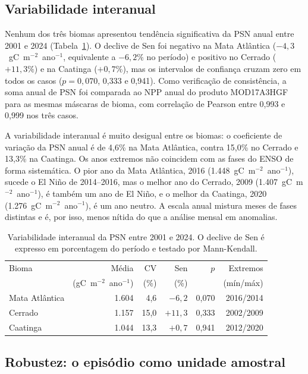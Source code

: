 \documentclass[a4paper,fleqn]{cas-sc}
\begin{document}
\subsection{Variabilidade interanual}

Nenhum dos três biomas apresentou tendência significativa da PSN anual entre 2001 e 2024 (Tabela~\ref{tab:interanual}). O declive de Sen foi negativo na Mata Atlântica ($-4{,}3$~gC~m$^{-2}$~ano$^{-1}$, equivalente a $-6{,}2\%$ no período) e positivo no Cerrado ($+11{,}3\%$) e na Caatinga ($+0{,}7\%$), mas os intervalos de confiança cruzam zero em todos os casos ($p = 0{,}070$, 0,333 e 0,941). Como verificação de consistência, a soma anual de PSN foi comparada ao NPP anual do produto MOD17A3HGF para as mesmas máscaras de bioma, com correlação de Pearson entre 0,993 e 0,999 nos três casos.

A variabilidade interanual é muito desigual entre os biomas: o coeficiente de variação da PSN anual é de 4,6\% na Mata Atlântica, contra 15,0\% no Cerrado e 13,3\% na Caatinga. Os anos extremos não coincidem com as fases do ENSO de forma sistemática. O pior ano da Mata Atlântica, 2016 (1.448~gC~m$^{-2}$~ano$^{-1}$), sucede o El Niño de 2014--2016, mas o melhor ano do Cerrado, 2009 (1.407~gC~m$^{-2}$~ano$^{-1}$), é também um ano de El Niño, e o melhor da Caatinga, 2020 (1.276~gC~m$^{-2}$~ano$^{-1}$), é um ano neutro. A escala anual mistura meses de fases distintas e é, por isso, menos nítida do que a análise mensal em anomalias.

\begin{table}[width=\linewidth,cols=6,pos=h]
\caption{Variabilidade interanual da PSN entre 2001 e 2024. O declive de Sen é expresso em porcentagem do período e testado por Mann-Kendall.}
\label{tab:interanual}
\begin{tabular*}{\tblwidth}{@{}lrrrrr@{}}
\toprule
Bioma & Média & CV & Sen & $p$ & Extremos \\
 & (gC~m$^{-2}$~ano$^{-1}$) & (\%) & (\%) & & (mín/máx) \\
\midrule
Mata Atlântica & 1.604 & 4,6  & $-6{,}2$  & 0,070 & 2016/2014 \\
Cerrado        & 1.157 & 15,0 & $+11{,}3$ & 0,333 & 2002/2009 \\
Caatinga       & 1.044 & 13,3 & $+0{,}7$  & 0,941 & 2012/2020 \\
\bottomrule
\end{tabular*}
\end{table}

\subsection{Robustez: o episódio como unidade amostral}
\end{document}
